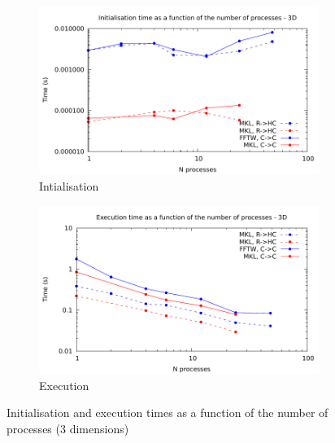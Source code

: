 \documentclass[12pt, a4paper]{article}
\begin{document}
\begin{figure}[H]
\captionsetup{width=0.8\linewidth}
\centering
\begin{subfigure}{.5\textwidth}
\centering
\includegraphics[width=.9\linewidth]{graphs/mpi-init-3d.pdf}
\caption{Intialisation}
\label{3DMPII}
\end{subfigure}%
\begin{subfigure}{.5\textwidth}
\centering
\includegraphics[width=.9\linewidth]{graphs/mpi-exec-3d.pdf}
\caption{Execution}
\label{3DMPIE}
\end{subfigure}
\caption{Initialisation and execution times as a function of the number of processes (3 dimensions)}
\label{3DMPI}
\end{figure}
\end{document}
